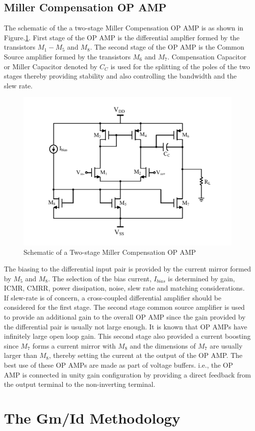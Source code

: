 \subsection{Miller Compensation OP AMP}
The schematic of the a two-stage Miller Compensation OP AMP is as shown in Figure.\ref{fig:OPAMP_Schematic_Ibias}. First stage of the OP AMP is the differential amplfier formed by the transistors $M_1-M_5$ and $M_8$. The second stage of the OP AMP is the Common Source amplifier formed by the transistors $M_6$ and $M_7$. Compensation Capacitor or Miller Capacitor denoted by $C_C$ is used for the splitting of the poles of the two stages thereby providing stability and also controlling the bandwidth and the slew rate. 
\begin{figure} [H]
\centering
\includegraphics[scale=1]{Figures/Schematics/OPAMP_Ibias.pdf}
\caption{Schematic of a Two-stage Miller Compensation OP AMP}
\label{fig:OPAMP_Schematic_Ibias}
\end{figure}
The biasing to the differential input pair is provided by the current mirror formed by $M_5$ and $M_8$. The selection of the bias current, $I_{bias}$ is determined by gain, ICMR, CMRR, power dissipation, noise, slew rate and matching considerations. If slew-rate is of concern, a cross-coupled differential amplifier should be considered for the first stage. The second stage common source amplifier is used to provide an additional gain to the overall OP AMP since the gain provided by the differential pair is usually not large enough. It is known that OP AMPs have infinitely large open loop gain. This second stage also provided a current boosting since $M_7$ forms a current mirror with $M_8$ and the dimensions of $M_7$ are usually larger than $M_8$, thereby setting the current at the output of the OP AMP. The best use of these OP AMPs are made as part of voltage buffers. i.e., the OP AMP is connected in unity gain configuration by providing a direct feedback from the output terminal to the non-inverting terminal.
\vfill
\clearpage
\section{The Gm/Id Methodology}
